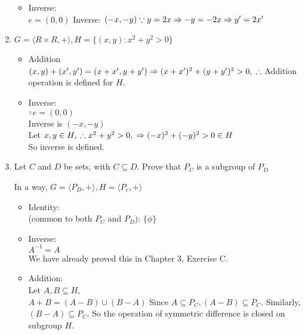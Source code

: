 \documentclass[12pt]{article}
\begin{document}
\begin{enumerate}
\begin{itemize}
    \item 
      Inverse: \\
      $e = (0,0)$ 
      Inverse: $(-x, -y) \\
      \because y = 2x \\
      \Rightarrow -y = -2x \\
      \Rightarrow y' = 2x'$

  \end{itemize}

\item $G = \langle R \times  R, + \rangle, H = \{(x,y) : x^{2} + y^{2} > 0\}$

  \begin{itemize}
    \item 
      Addition \\
      $(x,y) + (x',y') = (x + x', y+y') \\
      \Rightarrow (x+x')^{2} + (y+y')^{2} > 0, \\
      \therefore$ Addition operation is defined for $H$.
      
    \item
      Inverse: \\
      $\because e = (0,0)$ \\
      Inverse is $(-x, -y)$ \\
      Let $x, y \in H, \\
      \therefore x^{2} + y^{2} > 0, \\
      \Rightarrow (-x)^{2} + (-y)^{2} > 0 \in H$ \\
      So inverse is defined.

  \end{itemize}

\item Let $C$ and $D$ be sets, with $C \subseteq D$. Prove that $P_C$ is a subgroup of $P_D$

  In a way, $G = \langle P_D , + \rangle, H = \langle P_c , + \rangle$
  
\begin{itemize}
  \item 
    Identity: \\ (common to both $P_C$ and $P_D$): $\{\phi\}$
  \item 
    Inverse: \\
    $A^{-1} = A$ \\
    We have already proved this in Chapter 3, Exercise C.
  \item 
    Addition: \\
    Let $A, B \subseteq H$, \\
    $A + B = (A - B) \cup (B - A)$
    Since $A \subseteq P_C, (A - B) \subseteq P_C$. Similarly, $(B - A) \subseteq P_C$. So the operation of symmetric difference is closed on subgroup $H$. 

\end{itemize}

  \end{enumerate}
\end{document}
